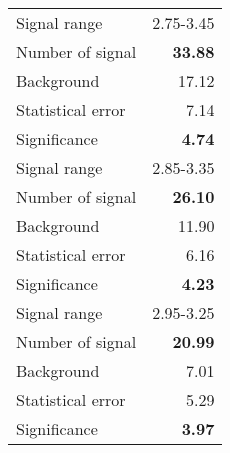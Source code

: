 {\large{
 \begin{tabular}{||l r||}
 \hline
 \hline
Signal range &      2.75-3.45 \\
Number of signal &  \textbf{  33.88} \\
Background &          17.12 \\
Statistical error &    7.14 \\
Significance &      \textbf{   4.74} \\
 \hline
Signal range &      2.85-3.35 \\
Number of signal &  \textbf{  26.10} \\
Background &          11.90 \\
Statistical error &    6.16 \\
Significance &      \textbf{   4.23} \\
 \hline
Signal range &      2.95-3.25 \\
Number of signal &  \textbf{  20.99} \\
Background &           7.01 \\
Statistical error &    5.29 \\
Significance &      \textbf{   3.97} \\
 \hline
 \hline
 \end{tabular}
 }}
 \endinput
